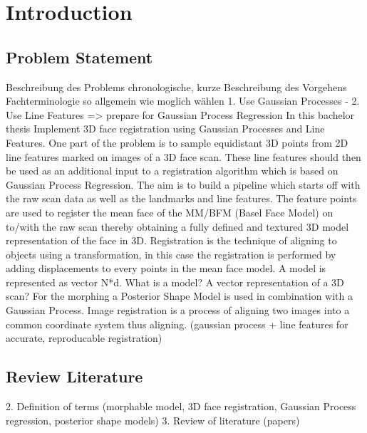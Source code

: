 \chapter{Introduction}
\section{Problem Statement}
Beschreibung des Problems
chronologische, kurze Beschreibung des Vorgehens
Fachterminologie so allgemein wie moglich wählen
1. Use Gaussian Processes - 2. Use Line Features => prepare for Gaussian Process Regression
In this bachelor thesis 
Implement 3D face registration using Gaussian Processes and Line Features. One part of the problem is to sample equidistant 3D points from 2D line features marked on images of a 3D face scan. These line features should then be used as an additional input to a registration algorithm which is based on Gaussian Process Regression. The aim is to build a pipeline which starts off with the raw scan data as well as the landmarks and line features. The feature points are used to register the mean face of the MM/BFM (Basel Face Model) on to/with the raw scan thereby obtaining a fully defined and textured 3D model representation of the face in 3D. Registration is the technique of aligning to objects using a transformation, in this case the registration is performed by adding displacements to every points in the mean face model.
A model is represented as vector N*d. What is a model? A vector representation of a 3D scan?
For the morphing a Posterior Shape Model is used in combination with a Gaussian Process.
Image registration is a process of aligning two images into a common coordinate system 
thus aligning.
(gaussian process + line features for accurate, reproducable registration)
\section{Review Literature}
	2. Definition of terms (morphable model, 3D face registration, Gaussian Process regression, posterior shape models)
	3. Review of literature (papers)


